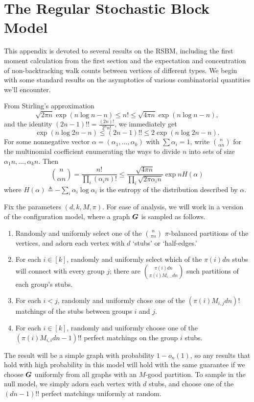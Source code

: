 \section{The Regular Stochastic Block Model}

This appendix is devoted to several results on the RSBM, including the first moment calculation from the first section and the expectation and concentration of non-backtracking walk counts between vertices of different types. We begin with some standard results on the asymptotics of various combinatorial quantities we'll encounter. 

From Stirling's approximation
$$
    \sqrt{2\pi n}\exp(n\log n - n) \le n! \le \sqrt{4\pi n}\exp(n\log n - n),
$$
and the identity $(2n-1)!! = \tfrac{(2n)!}{2^n n!}$, we immediately get
$$
    \exp(n\log 2n - n) \le (2n - 1)!! \le 2\exp(n\log 2n - n).
$$
For some nonnegative vector $\alpha = (\alpha_1,...,\alpha_k)$ with $\sum\alpha_i = 1$, write ${n \choose \alpha n}$ for the multinomial coefficient enumerating the ways to divide $n$ into sets of size $\alpha_1 n,...,\alpha_k n$. Then
$$
    {n \choose \alpha n} = \frac{n!}{\prod_i (\alpha_i n)!} \le \frac{\sqrt{4\pi n}}{\prod_i \sqrt{2\pi \alpha_i n}} \exp n H(\alpha)
$$
where $H(\alpha) \triangleq -\sum_i \alpha_i \log \alpha_i$ is the entropy of the distribution described by $\alpha$.

Fix the parameters $(d,k,M,\pi)$. For ease of analysis, we will work in a version of the configuration model, where a graph $\boldsymbol{G}$ is sampled as follows.
\begin{enumerate}
    \item Randomly and uniformly select one of the ${n\choose \pi n}$ $\pi$-balanced partitions of the vertices, and adorn each vertex with $d$ `stubs' or `half-edges.'
    \item For each $i \in [k]$, randomly and uniformly select which of the $\pi(i)dn$ stubs will connect with every group $j$; there are ${\pi(i)dn \choose \pi(i)M_{i,-} dn}$ such partitions of each group's stubs.
    \item For each $i<j$, randomly and uniformly chose one of the $(\pi(i)M_{i,j}dn)!$ matchings of the stubs between groups $i$ and $j$.
    \item For each $i\in[k]$, randomly and uniformly choose one of the $(\pi(i)M_{i,i}dn-1)!!$ perfect matchings on the group $i$ stubs.
\end{enumerate}
The result will be a simple graph with probability $1- o_n(1)$, so any results that hold with high probability in this model will hold with the same guarantee if we choose $\boldsymbol{G}$ uniformly from all graphs with an $M$-good partition. To sample in the null model, we simply adorn each vertex with $d$ stubs, and choose one of the $(dn-1)!!$ perfect matchings uniformly at random.

